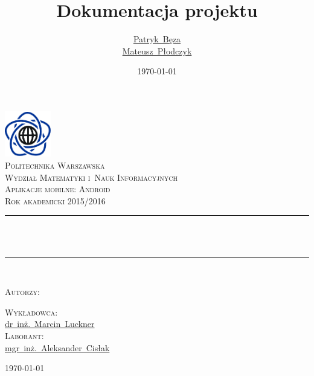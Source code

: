 \documentclass[a4paper,titlepage]{article}
\title{Dokumentacja projektu}
\author{
    \href{mailto:bezap@student.mini.pw.edu.pl}{Patryk~Bęza}\\[0.7em]
    \href{mailto:plodczykm@student.mini.pw.edu.pl}{Mateusz~Płodczyk}\\[0.7em]
}
\date{\today}
\theoremstyle{break}
\begin{document}
\makeatletter
\renewcommand{\ALG@name}{Algorytm}
\begin{titlepage}
\newcommand{\HRule}{\rule{\linewidth}{0.5mm}}
\center

\includegraphics[width=2.0cm]{img/mini}\\[1.5cm]
\textsc{\LARGE Politechnika Warszawska}\\[0.3cm]
\textsc{\Large Wydział Matematyki i~Nauk Informacyjnych}\\[1.5cm]
\textsc{\large Aplikacje mobilne: Android}\\[0.2cm]
\textsc{\small Rok akademicki 2015/2016}\\[1.5cm]

\HRule \\[1cm]
{ \huge \bfseries \@title}\\[0.7cm]
\HRule \\[1.75cm]

\begin{minipage}[t]{0.4\textwidth}
\begin{flushleft}\large
\textsc{Autorzy:}\\[3mm]
\@author
\end{flushleft}
\end{minipage}
\begin{minipage}[t]{0.4\textwidth}
\begin{flushright}\large
\textsc{Wykładowca:}\\[3mm]
\href{mailto:M.Luckner@mini.pw.edu.pl}{dr~inż.~Marcin~Luckner}\\[1cm]
\textsc{Laborant:}\\[3mm]
\href{mailto:A.Cislak@mini.pw.edu.pl}{mgr~inż.~Aleksander~Cisłak}\\[1cm]
\end{flushright}
\end{minipage}
\vfill
{\large \today}

\end{titlepage}

\tableofcontents
\clearpage

\end{document}
